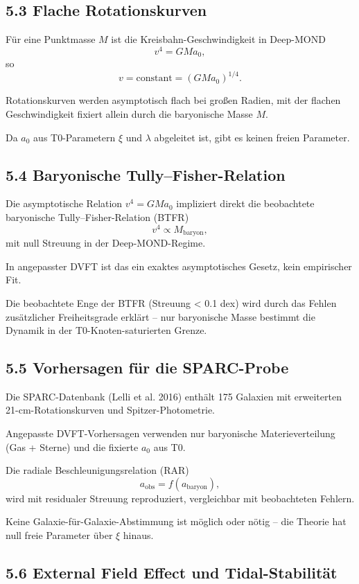 	\subsection{5.3 Flache Rotationskurven}
	
	Für eine Punktmasse $M$ ist die Kreisbahn-Geschwindigkeit in Deep-MOND
	\[
	v^4 = G M a_0,
	\]
	so
	\[
	v = \text{constant} = (G M a_0)^{1/4}.
	\]
	
	Rotationskurven werden asymptotisch flach bei großen Radien, mit der flachen Geschwindigkeit fixiert allein durch die baryonische Masse $M$.
	
	Da $a_0$ aus T0-Parametern $\xi$ und $\lambda$ abgeleitet ist, gibt es keinen freien Parameter.
	
	\subsection{5.4 Baryonische Tully–Fisher-Relation}
	
	Die asymptotische Relation $v^4 = G M a_0$ impliziert direkt die beobachtete baryonische Tully–Fisher-Relation (BTFR)
	\[
	v^4 \propto M_{\text{baryon}},
	\]
	mit null Streuung in der Deep-MOND-Regime.
	
	In angepasster DVFT ist das ein exaktes asymptotisches Gesetz, kein empirischer Fit.
	
	Die beobachtete Enge der BTFR (Streuung < 0.1 dex) wird durch das Fehlen zusätzlicher Freiheitsgrade erklärt – nur baryonische Masse bestimmt die Dynamik in der T0-Knoten-saturierten Grenze.
	
	\subsection{5.5 Vorhersagen für die SPARC-Probe}
	
	Die SPARC-Datenbank (Lelli et al. 2016) enthält 175 Galaxien mit erweiterten 21-cm-Rotationskurven und Spitzer-Photometrie.
	
	Angepasste DVFT-Vorhersagen verwenden nur baryonische Materieverteilung (Gas + Sterne) und die fixierte $a_0$ aus T0.
	
	Die radiale Beschleunigungsrelation (RAR)
	\[
	a_{\text{obs}} = f(a_{\text{baryon}}),
	\]
	wird mit residualer Streuung reproduziert, vergleichbar mit beobachteten Fehlern.
	
	Keine Galaxie-für-Galaxie-Abstimmung ist möglich oder nötig – die Theorie hat null freie Parameter über $\xi$ hinaus.
	
	\subsection{5.6 External Field Effect und Tidal-Stabilität}
	
